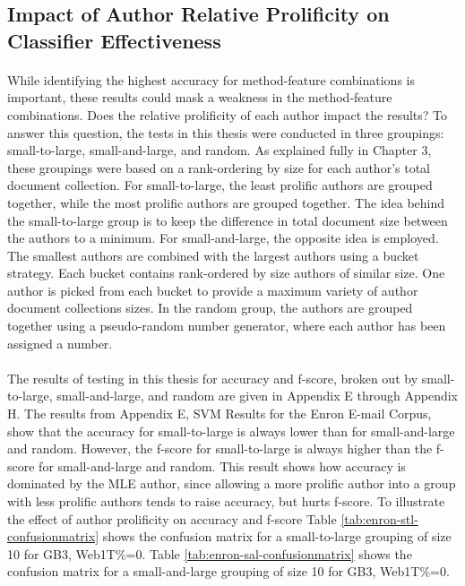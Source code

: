 \begin{singlespace}
\section{Impact of Author Relative Prolificity on Classifier Effectiveness}
\end{singlespace}
	\paragraph*{} While identifying the highest accuracy for method-feature combinations is important, these results could mask a weakness in the method-feature combinations.  Does the relative prolificity of each author impact the results?  To answer this question, the tests in this thesis were conducted in three groupings: small-to-large, small-and-large, and random.  As explained fully in Chapter 3, these groupings were based on a rank-ordering by size for each author's total document collection.  For small-to-large, the least prolific authors are grouped together, while the most prolific authors are grouped together. The idea behind the small-to-large group is to keep the difference in total document size between the authors to a minimum. For small-and-large, the opposite idea is employed.  The smallest authors are combined with the largest authors using a bucket strategy.  Each bucket contains rank-ordered by size authors of similar size.  One author is picked from each bucket to provide a maximum variety of author document collections sizes.  In the random group, the authors are grouped together using a pseudo-random number generator, where each author has been assigned a number.
	\paragraph*{} The results of testing in this thesis for accuracy and f-score, broken out by small-to-large, small-and-large, and random are given in Appendix E through Appendix H.  The results from Appendix E, SVM Results for the Enron E-mail Corpus, show that the accuracy for small-to-large is always lower than for small-and-large and random.  However, the f-score for small-to-large is always higher than the f-score for small-and-large and random.  This result shows how accuracy is dominated by the MLE author, since allowing a more prolific author into a group with less prolific authors tends to raise accuracy, but hurts f-score. To illustrate the effect of author prolificity on accuracy and f-score Table \ref{tab:enron-stl-confusionmatrix} shows the confusion matrix for a small-to-large grouping of size 10 for GB3, Web1T\%=0.  Table \ref{tab:enron-sal-confusionmatrix} shows the confusion matrix for a small-and-large grouping of size 10 for GB3, Web1T\%=0. 
	
